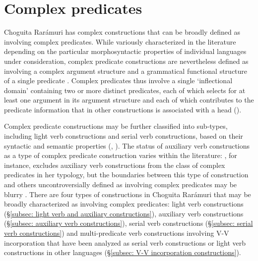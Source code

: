 \section{Complex predicates}
\label{sec: other complex constructions}

Choguita Rarámuri has complex constructions that can be broadly defined as involving complex predicates. While variously characterized in the literature depending on the particular morphosyntactic properties of individual languages under consideration, complex predicate constructions are nevertheless defined as involving a complex argument structure and a grammatical functional structure of a single predicate \citep[108]{butt1995structure}. Complex predicates thus involve a single `inflectional domain’ containing two or more distinct predicates, each of which selects for at least one argument in its argument structure \citep[247]{baker1997thematic} and each of which contributes to the predicate information that in other constructions is associated with a head (\citealt{butt2001semi}).


Complex predicate constructions may be further classified into sub-types, including light verb constructions and serial verb constructions, based on their syntactic and semantic properties (\citealt{butt1995structure}, \citealt{svenonius2008complex}). The status of auxiliary verb constructions as a type of complex predicate construction varies within the literature: \citet{butt1995structure}, for instance, excludes auxiliary verb constructions from the class of complex predicates in her typology, but the boundaries between this type of construction and others uncontroversially defined as involving complex predicates may be blurry \citep{svenonius2008complex}. There are four types of constructions in Choguita Rarámuri that may be broadly characterized as involving complex predicates: light verb constructions (§\ref{subsec: light verb and auxiliary constructions}), auxiliary verb constructions (§\ref{subsec: auxiliary verb constructions}), serial verb constructions (§\ref{subsec: serial verb constructions}) and multi-predicate verb constructions involving V-V incorporation that have been analyzed as serial verb constructions or light verb constructions in other  languages (§\ref{subsec: V-V incorporation constructions}).

